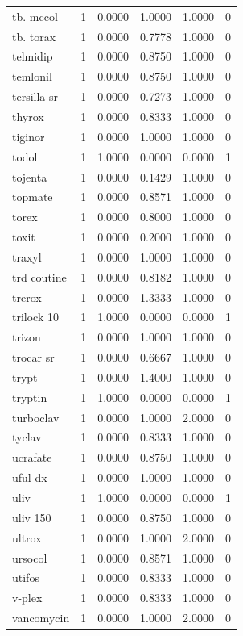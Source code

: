 \begin{longtable}{p{3.0cm}rrrrr}
tb. mccol & 1 & 0.0000 & 1.0000 & 1.0000 & 0 \\
tb. torax & 1 & 0.0000 & 0.7778 & 1.0000 & 0 \\
telmidip & 1 & 0.0000 & 0.8750 & 1.0000 & 0 \\
temlonil & 1 & 0.0000 & 0.8750 & 1.0000 & 0 \\
tersilla-sr & 1 & 0.0000 & 0.7273 & 1.0000 & 0 \\
thyrox & 1 & 0.0000 & 0.8333 & 1.0000 & 0 \\
tiginor & 1 & 0.0000 & 1.0000 & 1.0000 & 0 \\
todol & 1 & 1.0000 & 0.0000 & 0.0000 & 1 \\
tojenta & 1 & 0.0000 & 0.1429 & 1.0000 & 0 \\
topmate & 1 & 0.0000 & 0.8571 & 1.0000 & 0 \\
torex & 1 & 0.0000 & 0.8000 & 1.0000 & 0 \\
toxit & 1 & 0.0000 & 0.2000 & 1.0000 & 0 \\
traxyl & 1 & 0.0000 & 1.0000 & 1.0000 & 0 \\
trd coutine & 1 & 0.0000 & 0.8182 & 1.0000 & 0 \\
trerox & 1 & 0.0000 & 1.3333 & 1.0000 & 0 \\
trilock 10 & 1 & 1.0000 & 0.0000 & 0.0000 & 1 \\
trizon & 1 & 0.0000 & 1.0000 & 1.0000 & 0 \\
trocar sr & 1 & 0.0000 & 0.6667 & 1.0000 & 0 \\
trypt & 1 & 0.0000 & 1.4000 & 1.0000 & 0 \\
tryptin & 1 & 1.0000 & 0.0000 & 0.0000 & 1 \\
turboclav & 1 & 0.0000 & 1.0000 & 2.0000 & 0 \\
tyclav & 1 & 0.0000 & 0.8333 & 1.0000 & 0 \\
ucrafate & 1 & 0.0000 & 0.8750 & 1.0000 & 0 \\
uful dx & 1 & 0.0000 & 1.0000 & 1.0000 & 0 \\
uliv & 1 & 1.0000 & 0.0000 & 0.0000 & 1 \\
uliv 150 & 1 & 0.0000 & 0.8750 & 1.0000 & 0 \\
ultrox & 1 & 0.0000 & 1.0000 & 2.0000 & 0 \\
ursocol & 1 & 0.0000 & 0.8571 & 1.0000 & 0 \\
utifos & 1 & 0.0000 & 0.8333 & 1.0000 & 0 \\
v-plex & 1 & 0.0000 & 0.8333 & 1.0000 & 0 \\
vancomycin & 1 & 0.0000 & 1.0000 & 2.0000 & 0 \\

\end{longtable}
